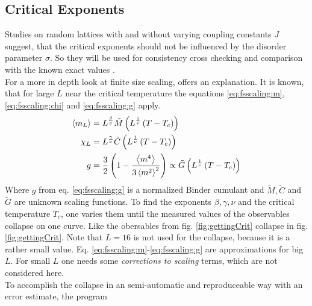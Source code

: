 \subsection{Critical Exponents}
    Studies on random lattices with\cite{Lima2000} and without\cite{Janke1994}
    varying coupling constants \(J\) suggest, that the
    critical exponents should not be influenced by the disorder parameter
    \(\sigma\). So they will be used for consistency cross checking and
    comparison with the known exact values \cite[S. 59]{Pelissetto2002}.\\
    For a more in depth look at finite size scaling, \cite{Norrenbrock2011}
    offers an explanation.
    It is known, that for large \(L\) near the critical temperature the
    equations \eqref{eq:fsscaling:m}, \eqref{eq:fsscaling:chi} and
    \eqref{eq:fsscaling:g} apply.
    \begin{align}
        \label{eq:fsscaling:m}
        \left< m_L \right> &= L^\frac{\beta}{\nu} \tilde{M}\left(L^\frac{1}{\nu}\left(T-T_c\right)\right)\\
        \label{eq:fsscaling:chi}
        \chi_L    &= L^\frac{\gamma}{\nu} \tilde{C}\left(L^\frac{1}{\nu}\left(T-T_c\right)\right)\\
        \label{eq:fsscaling:g}
        g          &= \frac{3}{2}\left(1-\frac{\left< m^4 \right>}{3\left< m^2 \right>^2}\right) \propto \tilde{G}\left(L^\frac{1}{\nu}\left(T-T_c\right)\right)
    \end{align}
    Where \(g\) from eq. \eqref{eq:fsscaling:g} is a normalized
    Binder cumulant \cite{Binder1981} and \(\tilde{M}, \tilde{C}\) and \(\tilde{G}\)
    are unknown scaling functions. To find the exponents
    \(\beta, \gamma, \nu\) and the critical temperature \(T_c\), one
    varies them until the measured values of the observables collapse on
    one curve. Like the obersables from fig. \ref{fig:gettingCrit}
    collapse in fig. \ref{fig:gettingCrit}.
    Note that \(L=16\) is not used for the collapse, because it is a
    rather small value. Eq. \eqref{eq:fsscaling:m}-\eqref{eq:fsscaling:g}
    are approximations for big \(L\). For small \(L\) one needs some
    \emph{corrections to scaling} terms, which are not considered here.\\
    To accomplish the collapse in an semi-automatic and reproduceable
    way with an error estimate, the program
